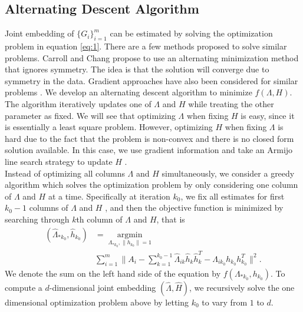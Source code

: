 \documentclass[10pt,journal,compsoc]{IEEEtran}
\begin{document}
\subsection{Alternating Descent Algorithm}
\noindent Joint embedding of $\{G_i \} _{i=1}^{m}$ can be estimated by solving the optimization problem in equation \eqref{eq:1}. There are a few methods proposed to solve similar problems. Carroll and Chang \cite{carroll1970analysis} propose to use an alternating minimization method that ignores symmetry. The idea is that the solution will converge due to symmetry in the data. Gradient approaches have also been considered for similar problems \cite{tang2009clustering} \cite{kolda2015numerical}. We develop an alternating descent algorithm to minimize $f(\Lambda,H)$. The algorithm iteratively updates one of $\Lambda$ and $H$ while treating the other parameter as fixed. We will see that optimizing $\Lambda$ when fixing $H$ is easy, since it is essentially a least square problem. However, optimizing $H$ when fixing $\Lambda$ is hard due to the fact that the problem is non-convex and there is no closed form solution available. In this case, we use gradient information and take an Armijo line search strategy to update $H$ \cite{nocedal2006numerical}. \\

\noindent Instead of optimizing all columns $\Lambda$ and $H$ simultaneously, we consider a greedy algorithm which solves the optimization problem by only considering one column of  $\Lambda$ and $H$ at a time. Specifically at iteration $k_0$, we fix all estimates for first $k_0-1$ columns of $\Lambda$ and $H$ , and then the objective function is minimized by searching through $k$th column of $\Lambda$ and $H$, that is
\begin{align}(\hat{\Lambda}_{*k_0},\hat{h}_{k_0}) &= \underset{\Lambda_{*k_0},\|h_{k_0}\|=1}{\operatorname{argmin}} \nonumber\\ &\sum\limits_{i=1}^{m} \| A_i- \sum\limits_{k=1}^{k_0-1} \hat{\Lambda}_{ik} \hat{h}_{k} \hat{h}_{k}^T -\Lambda_{ik_0} h_{k_0} h_{k_0}^T\|  ^2.
\label{eq:2}
\end{align} 
We denote the sum on the left hand side of the equation by $f(\Lambda_{*k_0},h_{k_0})$. To compute a $d$-dimensional joint embedding $(\hat{\Lambda},\hat{H})$, we recursively solve the one dimensional optimization problem above by letting $k_0$ to vary from $1$ to $d$. \\
\end{document}
